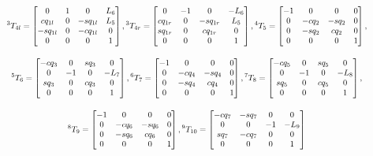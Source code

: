 \documentclass[a4paper,10pt]{article}
\newcommand\scalemath[2]{\scalebox{#1}{\mbox{\ensuremath{\displaystyle #2}}}}
\begin{document}
\[
 \scalemath{0.75}{{}^3T_{4l} = \left[\begin{matrix} 0 & 1 & 0 & L_6 \\ cq_{1l} & 0 & -sq_{1l} & L_5 \\ -sq_{1l} & 0 & -cq_{1l} & 0 \\ 0 & 0 & 0 & 1 \end{matrix}\right], 
 {}^3T_{4r} = \left[\begin{matrix} 0 & -1 & 0 & -L_6 \\ cq_{1r} & 0 & -sq_{1r} & L_5 \\ sq_{1r} & 0 & cq_{1r} & 0 \\ 0 & 0 & 0 & 1 \end{matrix}\right], 
 {}^4T_5 = \left[\begin{matrix} -1 & 0 & 0 & 0 \\ 0 & -cq_2 & -sq_2 & 0 \\ 0 & -sq_2 & cq_2 & 0 \\ 0 & 0 & 0 & 1 \end{matrix}\right], }
\]
 
\[
 \scalemath{0.75}{ {}^5T_6 = \left[\begin{matrix} -cq_3 & 0 & sq_3 & 0 \\ 0 & -1 & 0 & -L_7 \\ sq_3 & 0 & cq_3 & 0 \\ 0 & 0 & 0 & 1 \end{matrix}\right], 
 {}^6T_7 = \left[\begin{matrix} -1 & 0 & 0 & 0 \\ 0 & -cq_4 & -sq_4 & 0 \\ 0 & -sq_4 & cq_4 & 0 \\ 0 & 0 & 0 & 1 \end{matrix}\right], 
 {}^7T_8 = \left[\begin{matrix} -cq_5 & 0 & sq_5 & 0 \\ 0 & -1 & 0 & -L_8 \\ sq_5 & 0 & cq_5 & 0 \\ 0 & 0 & 0 & 1 \end{matrix}\right], }
\]
 
\[
 \scalemath{0.75}{{}^8T_9 = \left[\begin{matrix} -1 & 0 & 0 & 0 \\ 0 & -cq_6 & -sq_6 & 0 \\ 0 & -sq_6 & cq_6 & 0 \\ 0 & 0 & 0 & 1 \end{matrix}\right], 
 {}^9T_{10} = \left[\begin{matrix} -cq_7 & -sq_7 & 0 & 0 \\ 0 & 0 & -1 & -L_9 \\ sq_7 & -cq_7 & 0 & 0 \\ 0 & 0 & 0 & 1 \end{matrix}\right] }
\]
\end{document}
